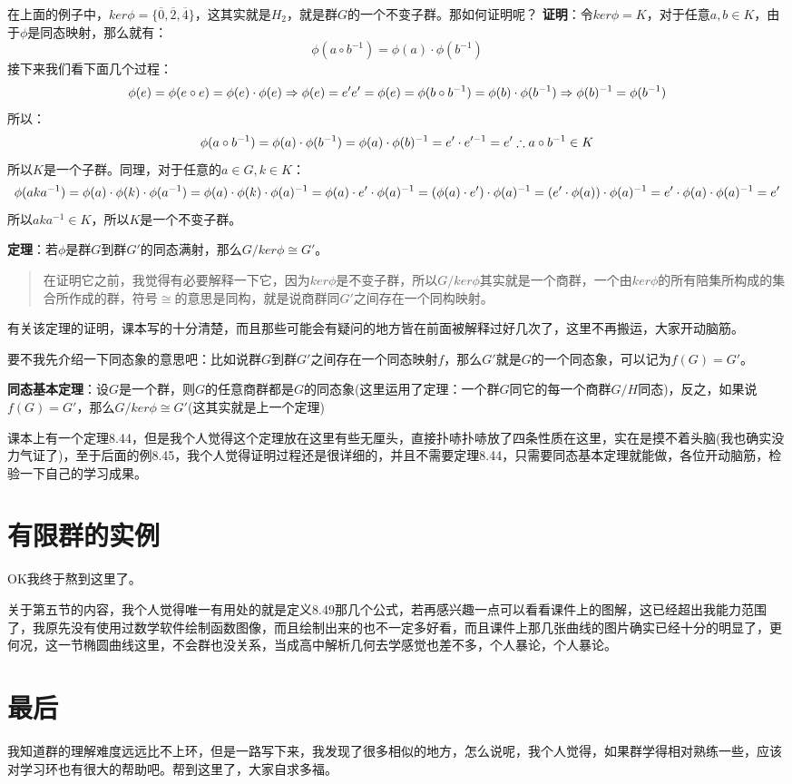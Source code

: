 \documentclass[12pt, a4paper, oneside]{ctexart}
\newenvironment{myquote}{\begin{quote}\small\color{gray}}{\end{quote}}
\begin{document}
在上面的例子中，$ker \phi=\{\overline{0},\overline{2},\overline{4}\}$，这其实就是$H_2$，就是群$G$的一个不变子群。那如何证明呢？
\textbf{证明}：令$ker \phi=K$，对于任意$a,b\in K$，由于$\phi$是同态映射，那么就有：
\[
\phi(a\circ b^{-1})=\phi(a)\cdot\phi(b^{-1})
\]
接下来我们看下面几个过程：
\[
\phi(e)=\phi(e\circ e)=\phi(e)\cdot\phi(e)\Rightarrow \phi(e)=e'\\
e'=\phi(e)=\phi(b\circ b^{-1})=\phi(b)\cdot\phi(b^{-1})\Rightarrow \phi(b)^{-1}=\phi(b^{-1})
\]
所以：
\[
\phi(a\circ b^{-1})=\phi(a)\cdot\phi(b^{-1})=\phi(a)\cdot\phi(b)^{-1}=e'\cdot e'^{-1}=e'\\
\therefore a\circ b^{-1}\in K
\]
所以$K$是一个子群。同理，对于任意的$a\in G,k\in K$：
\[
\phi(aka^{-1})=\phi(a)\cdot\phi(k)\cdot\phi(a^{-1})=\phi(a)\cdot\phi(k)\cdot\phi(a)^{-1}\\
=\phi(a)\cdot e'\cdot\phi(a)^{-1}=(\phi(a)\cdot e')\cdot\phi(a)^{-1}=(e'\cdot\phi(a))\cdot\phi(a)^{-1}\\
=e'\cdot\phi(a)\cdot\phi(a)^{-1}=e'
\]
所以$aka^{-1}\in K$，所以$K$是一个不变子群。

\textbf{定理}：若$\phi$是群$G$到群$G'$的同态满射，那么$G/ker\phi\cong G'$。

\begin{myquote}
在证明它之前，我觉得有必要解释一下它，因为$ker \phi$是不变子群，所以$G/ker\phi$其实就是一个商群，一个由$ker \phi$的所有陪集所构成的集合所作成的群，符号$\cong$的意思是同构，就是说商群同$G'$之间存在一个同构映射。
\end{myquote}

有关该定理的证明，课本写的十分清楚，而且那些可能会有疑问的地方皆在前面被解释过好几次了，这里不再搬运，大家开动脑筋。

要不我先介绍一下同态象的意思吧：比如说群$G$到群$G'$之间存在一个同态映射$f$，那么$G'$就是$G$的一个同态象，可以记为$f(G)=G'$。

\textbf{同态基本定理}：设$G$是一个群，则$G$的任意商群都是$G$的同态象(这里运用了定理：一个群$G$同它的每一个商群$G/H$同态)，反之，如果说$f(G)=G'$，那么$G/ker\phi\cong G'$(这其实就是上一个定理)

课本上有一个定理8.44，但是我个人觉得这个定理放在这里有些无厘头，直接扑哧扑哧放了四条性质在这里，实在是摸不着头脑(我也确实没力气证了)，至于后面的例8.45，我个人觉得证明过程还是很详细的，并且不需要定理8.44，只需要同态基本定理就能做，各位开动脑筋，检验一下自己的学习成果。

\section{有限群的实例}

OK我终于熬到这里了。

关于第五节的内容，我个人觉得唯一有用处的就是定义8.49那几个公式，若再感兴趣一点可以看看课件上的图解，这已经超出我能力范围了，我原先没有使用过数学软件绘制函数图像，而且绘制出来的也不一定多好看，而且课件上那几张曲线的图片确实已经十分的明显了，更何况，这一节椭圆曲线这里，不会群也没关系，当成高中解析几何去学感觉也差不多，个人暴论，个人暴论。

\section{最后}

我知道群的理解难度远远比不上环，但是一路写下来，我发现了很多相似的地方，怎么说呢，我个人觉得，如果群学得相对熟练一些，应该对学习环也有很大的帮助吧。帮到这里了，大家自求多福。
\end{document}
